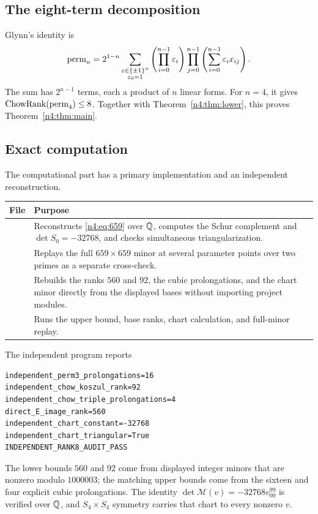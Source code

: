 \subsection{The eight-term decomposition}\label{n4:sec:upper}

Glynn's identity is
\begin{equation}\label{n4:eq:glynn}
  \operatorname{perm}_n=2^{1-n}
  \sum_{\substack{\varepsilon\in\{\pm1\}^n\\\varepsilon_0=1}}
  \left(\prod_{i=0}^{n-1}\varepsilon_i\right)
  \prod_{j=0}^{n-1}
  \left(\sum_{i=0}^{n-1}\varepsilon_i x_{ij}\right).
\end{equation}
The sum has \(2^{n-1}\) terms, each a product of \(n\) linear forms. For
\(n=4\), it gives \(\operatorname{ChowRank}(\operatorname{perm}_4)\leq8\). Together with
Theorem~\ref{n4:thm:lower}, this proves Theorem~\ref{n4:thm:main}.

\subsection{Exact computation}\label{n4:sec:computation}

The computational part has a primary implementation and an independent
reconstruction.
\begingroup
\small
\begin{center}
\begin{tabularx}{0.94\textwidth}{@{}>{\hsize}L>{\hsize}L@{}}
\toprule
File & Purpose\\
\midrule
{}
& Reconstructs \eqref{n4:eq:659} over \(\mathbb Q\), computes the Schur complement
and \(\det S_0=-32768\), and checks simultaneous triangularization.\\
& Replays the full \(659\times659\) minor at several parameter points over
two primes as a separate cross-check.\\
& Rebuilds the ranks \(560\) and \(92\), the cubic prolongations, and the
chart minor directly from the displayed bases without importing project
modules.\\
& Runs the upper bound, base ranks, chart calculation, and full-minor replay.\\
\bottomrule
\end{tabularx}
\end{center}

The independent program reports
\begin{verbatim}
independent_perm3_prolongations=16
independent_chow_koszul_rank=92
independent_chow_triple_prolongations=4
direct_E_image_rank=560
independent_chart_constant=-32768
independent_chart_triangular=True
INDEPENDENT_RANK8_AUDIT_PASS
\end{verbatim}
The lower bounds \(560\) and \(92\) come from displayed integer minors that
are nonzero modulo \(1000003\); the matching upper bounds come from the
sixteen and four explicit cubic prolongations. The identity
\(\det\mathcal M(v)=-32768v_{00}^{99}\) is verified over \(\mathbb Q\), and
\(S_4\times S_4\) symmetry carries that chart to every nonzero \(v\).


